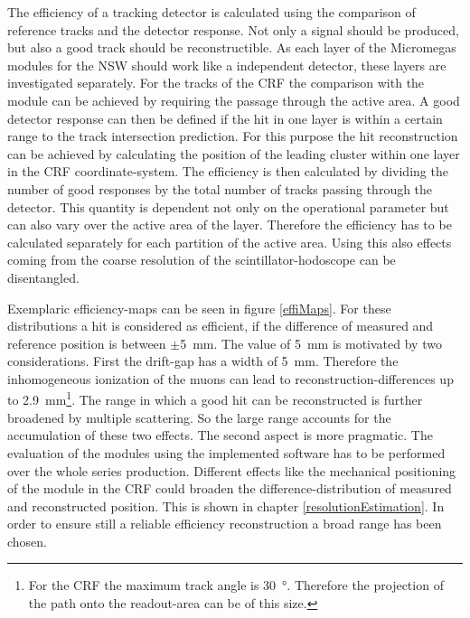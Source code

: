 \documentclass[
twoside,            %
BCOR1.4cm,          %
10pt,               %
headings=normal,    %
headsepline,        %
clearplainpage,		%
final,              %
div=14,
open=right,
bibliography=toc
]{scrreprt}
\begin{document}
The efficiency of a tracking detector is calculated using the comparison of reference tracks and the detector response.
Not only a signal should be produced, but also a good track should be reconstructible.
As each layer of the Micromegas modules for the NSW should work like a independent detector, these layers are investigated separately.
For the tracks of the CRF the comparison with the module can be achieved by requiring the passage through the active area.
A good detector response can then be defined if the hit in one layer is within a certain range to the track intersection prediction.
For this purpose the hit reconstruction can be achieved by calculating the position of the leading cluster within one layer in the CRF coordinate-system.
The efficiency is then calculated by dividing the number of good responses by the total number of tracks passing through the detector.
This quantity is dependent not only on the operational parameter but can also vary over the active area of the layer.
Therefore the efficiency has to be calculated separately for each partition of the active area.
Using this also effects coming from the coarse resolution of the scintillator-hodoscope can be disentangled.

Exemplaric efficiency-maps can be seen in figure \ref{effiMaps}.
For these distributions a hit is considered as efficient, if the difference of measured and reference position is between $\pm$\SI{5}{mm}.
The value of \SI{5}{mm} is motivated by two considerations.
First the drift-gap has a width of \SI{5}{mm}. 
Therefore the inhomogeneous ionization of the muons can lead to reconstruction-differences up to \SI{2.9}{mm}\footnote{
	For the CRF the maximum track angle is \SI{30}{\degree}. 
	Therefore the projection of the path onto the readout-area can be of this size.
}.
The range in which a good hit can be reconstructed is further broadened by multiple scattering.
So the large range accounts for the accumulation of these two effects.
The second aspect is more pragmatic.
The evaluation of the modules using the implemented software has to be performed over the whole series production. 
Different effects like the mechanical positioning of the module in the CRF could broaden the difference-distribution of measured and reconstructed position.
This is shown in chapter \ref{resolutionEstimation}.
In order to ensure still a reliable efficiency reconstruction a broad range has been chosen.
\end{document}
